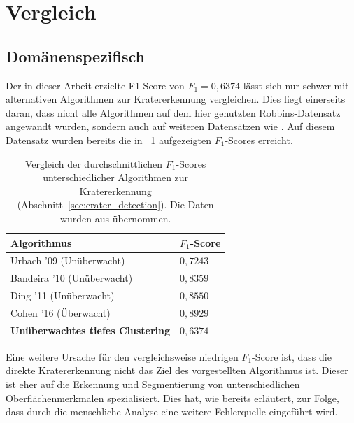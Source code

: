 
\section{Vergleich}
\label{sec:comparison}

\subsection{Domänenspezifisch}

Der in dieser Arbeit erzielte F1-Score von $F_1=0,6374$ lässt sich nur schwer mit alternativen Algorithmen zur Kratererkennung vergleichen. Dies liegt einerseits daran, dass nicht alle Algorithmen auf dem hier genutzten Robbins-Datensatz \cite{robbins_12} angewandt wurden, sondern auch auf weiteren Datensätzen wie \cite{bandeira_10}. Auf diesem Datensatz wurden bereits die in \tablename~\ref{tab:f1_comparision} aufgezeigten $F_1$-Scores erreicht.

\begin{table}[h!]
	\begin{tabularx}{\textwidth}{p{} >{\centering\arraybackslash}p{}}
		\toprule
		\textbf{Algorithmus} & \textbf{$F_1$-Score} \\
		\midrule
		Urbach '09 \cite{urbach_stepinski_2009} (Unüberwacht) & $0,7243$ \\
		Bandeira '10 \cite{bandeira_10} (Unüberwacht) & $0,8359$ \\
		Ding '11 \cite{ding_11} (Unüberwacht) & $0,8550$ \\
		Cohen '16 \cite{cohen_16} (Überwacht) & $0,8929$ \\
		\textbf{Unüberwachtes tiefes Clustering} & $0,6374$\\
		\bottomrule
	\end{tabularx}
	\caption{Vergleich der durchschnittlichen $F_1$-Scores unterschiedlicher Algorithmen zur Kratererkennung (\vgl Abschnitt~\ref{sec:crater_detection}). Die Daten wurden aus \cite{cohen_16} übernommen.}
	\label{tab:f1_comparision}
\end{table}

Eine weitere Ursache für den vergleichsweise niedrigen $F_1$-Score ist, dass die direkte Kratererkennung nicht das Ziel des vorgestellten Algorithmus ist. Dieser ist eher auf die Erkennung und Segmentierung von unterschiedlichen Oberflächenmerkmalen spezialisiert. Dies hat, wie bereits erläutert, zur Folge, dass durch die menschliche Analyse eine weitere Fehlerquelle eingeführt wird.

